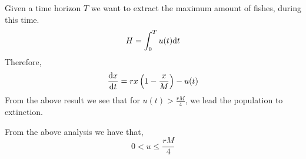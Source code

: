 Given a time horizon $T$ we want to extract the maximum amount of fishes, during this time.
\begin{equation}
H=\int_{0}^{T} u(t)\mathrm{d} t
\end{equation}
Therefore,
\begin{equation}
	\frac{\mathrm{d} x}{{\mathrm{d} t}}=rx\left(1-\frac{x}{M}\right)-u(t)
\end{equation}
From the above result we see that for $u(t)>\frac{rM}{4}$, we lead the population to extinction.

From the above analysis we have that,
\begin{equation}
0<u\leq\frac{rM}{4}
\end{equation}